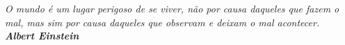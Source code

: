 \begin{epigrafe}
\vspace*{\fill}


\begin{flushright}
	\begin{minipage}{7cm}
	\end{minipage}
	\begin{minipage}{7cm}
		\flushright
		\textit{O mundo é um lugar perigoso de se viver, não por causa daqueles que fazem o mal, mas sim por causa daqueles que observam e deixam o mal acontecer.\\
		\textbf{Albert Einstein}}
	\end{minipage}
\end{flushright}

\end{epigrafe}